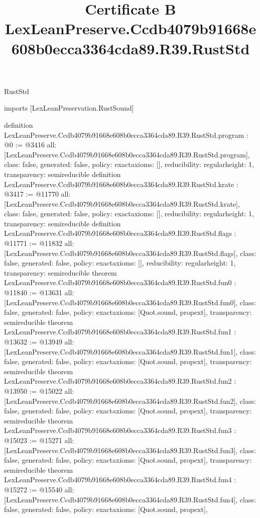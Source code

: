 \begin{lexlean}{RustStd}
\title{Certificate B LexLeanPreserve.Ccdb4079b91668e608b0ecca3364cda89.R39.RustStd}
\begin{coremodule}
imports [LexLeanPreservation.RustSound]

definition LexLeanPreserve.Ccdb4079b91668e608b0ecca3364cda89.R39.RustStd.program : @0 := @3416 {
  all: [LexLeanPreserve.Ccdb4079b91668e608b0ecca3364cda89.R39.RustStd.program],
  class: false,
  generated: false,
  policy: exact{axioms: []},
  reducibility: regular{height: 1},
  transparency: semireducible
}
definition LexLeanPreserve.Ccdb4079b91668e608b0ecca3364cda89.R39.RustStd.krate : @3417 := @11770 {
  all: [LexLeanPreserve.Ccdb4079b91668e608b0ecca3364cda89.R39.RustStd.krate],
  class: false,
  generated: false,
  policy: exact{axioms: []},
  reducibility: regular{height: 1},
  transparency: semireducible
}
definition LexLeanPreserve.Ccdb4079b91668e608b0ecca3364cda89.R39.RustStd.flags : @11771 := @11832 {
  all: [LexLeanPreserve.Ccdb4079b91668e608b0ecca3364cda89.R39.RustStd.flags],
  class: false,
  generated: false,
  policy: exact{axioms: []},
  reducibility: regular{height: 1},
  transparency: semireducible
}
theorem LexLeanPreserve.Ccdb4079b91668e608b0ecca3364cda89.R39.RustStd.fun0 : @11840 := @13631 {
  all: [LexLeanPreserve.Ccdb4079b91668e608b0ecca3364cda89.R39.RustStd.fun0],
  class: false,
  generated: false,
  policy: exact{axioms: [Quot.sound, propext]},
  transparency: semireducible
}
theorem LexLeanPreserve.Ccdb4079b91668e608b0ecca3364cda89.R39.RustStd.fun1 : @13632 := @13949 {
  all: [LexLeanPreserve.Ccdb4079b91668e608b0ecca3364cda89.R39.RustStd.fun1],
  class: false,
  generated: false,
  policy: exact{axioms: [Quot.sound, propext]},
  transparency: semireducible
}
theorem LexLeanPreserve.Ccdb4079b91668e608b0ecca3364cda89.R39.RustStd.fun2 : @13950 := @15022 {
  all: [LexLeanPreserve.Ccdb4079b91668e608b0ecca3364cda89.R39.RustStd.fun2],
  class: false,
  generated: false,
  policy: exact{axioms: [Quot.sound, propext]},
  transparency: semireducible
}
theorem LexLeanPreserve.Ccdb4079b91668e608b0ecca3364cda89.R39.RustStd.fun3 : @15023 := @15271 {
  all: [LexLeanPreserve.Ccdb4079b91668e608b0ecca3364cda89.R39.RustStd.fun3],
  class: false,
  generated: false,
  policy: exact{axioms: [Quot.sound, propext]},
  transparency: semireducible
}
theorem LexLeanPreserve.Ccdb4079b91668e608b0ecca3364cda89.R39.RustStd.fun4 : @15272 := @15540 {
  all: [LexLeanPreserve.Ccdb4079b91668e608b0ecca3364cda89.R39.RustStd.fun4],
  class: false,
  generated: false,
  policy: exact{axioms: [Quot.sound, propext]},
}
\end{coremodule}
\end{lexlean}

